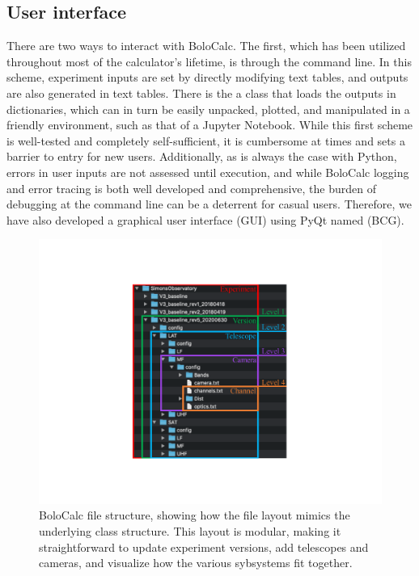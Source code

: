 
\subsection{User interface}
\label{sec:bolocalc_user_interface}

There are two ways to interact with BoloCalc. The first, which has been utilized throughout most of the calculator's lifetime, is through the command line. In this scheme, experiment inputs are set by directly modifying text tables, and outputs are also generated in text tables. There is the a class that loads the outputs in dictionaries, which can in turn be easily unpacked, plotted, and manipulated in a friendly environment, such as that of a Jupyter Notebook. While this first scheme is well-tested and completely self-sufficient, it is cumbersome at times and sets a barrier to entry for new users. Additionally, as is always the case with Python, errors in user inputs are not assessed until execution, and while BoloCalc logging and error tracing is both well developed and comprehensive, the burden of debugging at the command line can be a deterrent for casual users. Therefore, we have also developed a graphical user interface (GUI) using PyQt named  (BCG).

\begin{figure}
    \centering
    \includegraphics[width=0.8\linewidth, trim=6cm 3.4cm 6cm 3.4cm, clip]{PolarizationModulation/Figures/bolocalc_file_structure.pdf}
    \caption{BoloCalc file structure, showing how the file layout mimics the underlying class structure. This layout is modular, making it straightforward to update experiment versions, add telescopes and cameras, and visualize how the various sybsystems fit together.}
    \label{fig:bolocalc_file_layout}
\end{figure}

